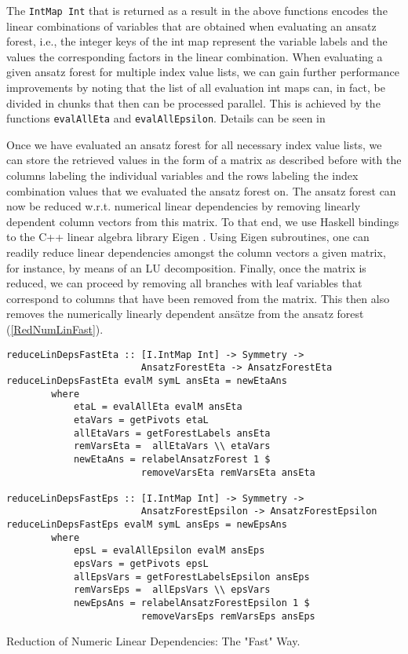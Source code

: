 The \texttt{IntMap Int} that is returned as a result in the above functions encodes the linear combinations of variables that are obtained when evaluating an ansatz forest, i.e., the integer keys of the int map represent the variable labels and the values the corresponding factors in the linear combination. 
When evaluating a given ansatz forest for multiple index value lists, we can gain further performance improvements by noting that the list of all evaluation int maps can, in fact, be divided in chunks that then can be processed parallel. This is achieved by the functions \texttt{evalAllEta} and \texttt{evalAllEpsilon}. Details can be seen in \cite{sparse-tensor}

Once we have evaluated an ansatz forest for all necessary index value lists, we can store the retrieved values in the form of a matrix as described before with the columns labeling the individual variables and the rows labeling the index combination values that we evaluated the ansatz forest on. The ansatz forest can now be reduced w.r.t. numerical linear dependencies by removing linearly dependent column vectors from this matrix. To that end, we use Haskell bindings \cite{HackageEigen} to the C++ linear algebra library Eigen \cite{eigenweb}. Using Eigen subroutines, one can readily reduce linear dependencies amongst the column vectors a given matrix, for instance, by means of an LU decomposition. Finally, once the matrix is reduced, we can proceed by removing all branches with leaf variables that correspond to columns that have been removed from the matrix. This then also removes the numerically linearly dependent ansätze from the ansatz forest (\ref{RedNumLinFast}).
\begin{listing}[hbt!]
\begin{verbatim}
reduceLinDepsFastEta :: [I.IntMap Int] -> Symmetry ->
                        AnsatzForestEta -> AnsatzForestEta
reduceLinDepsFastEta evalM symL ansEta = newEtaAns
        where
            etaL = evalAllEta evalM ansEta
            etaVars = getPivots etaL
            allEtaVars = getForestLabels ansEta
            remVarsEta =  allEtaVars \\ etaVars
            newEtaAns = relabelAnsatzForest 1 $
                        removeVarsEta remVarsEta ansEta

reduceLinDepsFastEps :: [I.IntMap Int] -> Symmetry ->
                        AnsatzForestEpsilon -> AnsatzForestEpsilon
reduceLinDepsFastEps evalM symL ansEps = newEpsAns
        where
            epsL = evalAllEpsilon evalM ansEps
            epsVars = getPivots epsL
            allEpsVars = getForestLabelsEpsilon ansEps
            remVarsEps =  allEpsVars \\ epsVars
            newEpsAns = relabelAnsatzForestEpsilon 1 $
                        removeVarsEps remVarsEps ansEps 
\end{verbatim} 
\caption{Reduction of Numeric Linear Dependencies: The "Fast" Way.}\label{RedNumLinFast}
\end{listing}

